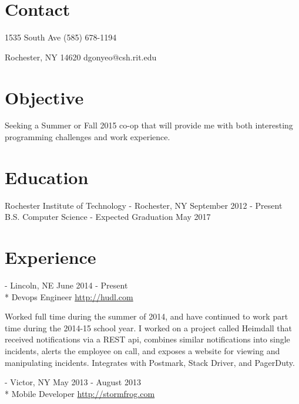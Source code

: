 \documentclass[letterpaper,margin,line,11pt]{resume}
\newcommand{\rurl}[1]{\hfill {\footnotesize \url{#1}}}
\newcommand{\rdate}[1]{\hfill {\small #1}}
\renewcommand{\employer}[5]{\item[#1] - #2 \rdate{#3} \\* #4 \rurl{#5}}
\begin{document}
\begin{resume}
\section{\mysidestyle Contact} 
    \begin{asparablank}
        \item 1535 South Ave \hfill (585) 678-1194
        \item Rochester, NY 14620 \hfill dgonyeo@csh.rit.edu
    \end{asparablank}

\section{\mysidestyle Objective}
    Seeking a Summer or Fall 2015 co-op that will provide me with both interesting programming challenges and work experience.

\section{\mysidestyle Education}
    \begin{compactdesc}
        \item[Rochester Institute of Technology] - Rochester, NY \rdate{September 2012 - Present}
        \small
        \\B.S. Computer Science  - Expected Graduation May 2017
    \end{compactdesc}

\section{\mysidestyle Experience}
    \begin{asparadesc}
        \employer{Hudl}{Lincoln, NE}{June 2014 - Present}{Devops Engineer}{http://hudl.com}

        \small
        Worked full time during the summer of 2014, and have continued to work part time during the 2014-15 school year. I worked on a project called Heimdall that received notifications via a REST api, combines similar notifications into single incidents, alerts the employee on call, and exposes a website for viewing and manipulating incidents. Integrates with Postmark, Stack Driver, and PagerDuty.
        \normalsize
        \\
        \employer{Stormfrog}{Victor, NY}{May 2013 - August 2013}{Mobile Developer}{http://stormfrog.com}


\end{asparadesc}
\end{resume}
\end{document}
